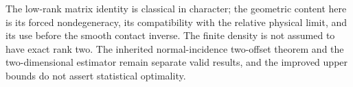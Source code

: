 The low-rank matrix identity is classical in character; the geometric
content here is its forced nondegeneracy, its compatibility with the
relative physical limit, and its use before the smooth contact inverse.
The finite density is not assumed to have exact rank two.  The inherited
normal-incidence two-offset theorem and the two-dimensional estimator
remain separate valid results, and the improved upper bounds do not
assert statistical optimality.
